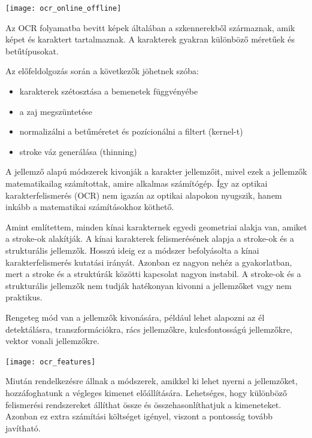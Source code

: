 \begin{center}
\texttt{[image: ocr\_online\_offline]}
\end{center}

Az OCR folyamatba bevitt képek általában a szkennerekből származnak, amik képet és karaktert tartalmaznak. A karakterek gyakran különböző méretűek és betűtípusokat.

Az előfeldolgozás során a következők jöhetnek szóba: 
\begin{itemize}
\item karakterek szétosztása a bemenetek függvényébe
\item a zaj megszüntetése
\item normalizálni a betűméretet és pozícionálni a filtert (kernel-t)
\item stroke váz generálása (thinning)
\end{itemize}

A jellemző alapú módszerek kivonják a karakter jellemzőit, mivel ezek a jellemzők matematikailag számítottak, amire alkalmas számítógép. Így az optikai karakterfelismerés (OCR) nem igazán az optikai alapokon nyugszik, hanem inkább a matematikai számításokhoz köthető.

Amint említettem, minden kínai karakternek egyedi geometriai alakja van, amiket a stroke-ok alakítják. A kínai karakterek felismerésének alapja a stroke-ok és a strukturális jellemzők. Hosszú ideig ez a módszer befolyásolta a kínai karakterfelismerés kutatási irányát. Azonban ez nagyon nehéz a gyakorlatban, mert a stroke és a struktúrák közötti kapcsolat nagyon instabil. A stroke-ok és a strukturális jellemzők nem tudják hatékonyan kivonni a jellemzőket vagy nem praktikus.

Rengeteg mód van a jellemzők kivonására, például lehet alapozni az él detektálásra, transzformációkra, rács jellemzőkre, kulcsfontosságú jellemzőkre, vektor vonali jellemzőkre.

\begin{center}
\texttt{[image: ocr\_features]}
\end{center}

Miután rendelkezésre állnak a módszerek, amikkel ki lehet nyerni a jellemzőket, hozzáfoghatunk a végleges kimenet előállítására. Lehetséges, hogy különböző felismerési rendszereket állíthat össze és összehasonlíthatjuk a kimeneteket. Azonban ez extra számítási költséget igényel, viszont a pontosság tovább javítható.

